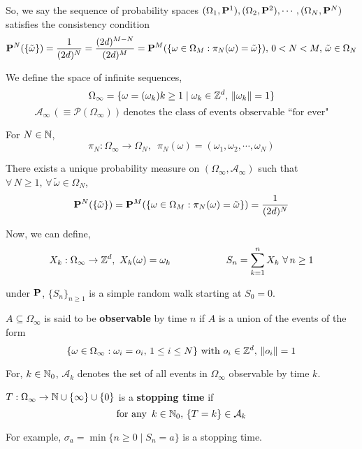 \documentclass[main]{subfiles}
\begin{document}
So, we say the sequence of probability spaces $(\Omega_1,\P^1),(\Omega_2,\P^2),\cdots,(\Omega_N,\P^N)$ satisfies the consistency condition
$$\P^N(\{\tilde{\omega}\}) = \frac{1}{(2d)^N} = \frac{(2d)^{M-N}}{(2d)^M}=\P^M(\{\omega \in \Omega_M : \pi_N(\omega) = \tilde{\omega}\}),\,0<N<M,\,\tilde{\omega} \in \Omega_N $$

We define the space of infinite sequences,
$$\Omega_{\infty} = \{\omega = (\omega_k)k \geq 1 \mid \omega_k \in \Z^d,\,\lVert \omega_k \rVert = 1\}$$
$$\mathcal{A}_{\infty}\,(\equiv \mathcal{P}(\Omega_{\infty}))\,\text{denotes the class of events observable ``for ever"}$$

For $N \in \N$,
$$\pi_N : \Omega_{\infty} \to \Omega_N,\,\,\,\pi_N(\omega) = (\omega_1,\omega_2,\cdots,\omega_N)$$

\begin{theorem}
    \normalfont
    There exists a unique probability measure on $(\Omega_{\infty},\mathcal{A}_{\infty})$ such that $\forall\,N \geq 1,\,\forall\,\tilde{\omega} \in \Omega_N$,
    $$\P^N(\{\tilde{\omega}\}) =\P^M(\{\omega \in \Omega_M : \pi_N(\omega) = \tilde{\omega}\})= \frac{1}{(2d)^N}$$
\end{theorem}
Now, we can define,
$$X_k : \Omega_{\infty} \to \Z^d,\,\,X_k(\omega) = \omega_k \hspace{2cm} S_n = \sum_{k=1}^{n} X_k\,\,\forall\,n \geq 1$$

under $\P$, $\{S_n\}_{n \geq 1}$ is a simple random walk starting at $S_0 = 0$.

\begin{definition}
    \normalfont
    $A \subseteq \Omega_{\infty}$ is said to be \textbf{observable} by time $ n $ if $A$ is a union of the events of the form
    $$\{\omega \in \Omega_{\infty} : \omega_i = o_i,\,1 \leq i \leq N\}\,\,\text{with}\,\,o_i \in \Z^d,\,\lVert o_i \rVert = 1$$
\end{definition}

For, $k \in \N_{0}$, $\mathcal{A}_k$ denotes the set of all events in $\Omega_{\infty}$ observable by time $k$.

\begin{definition}
    \normalfont
    $T : \Omega_{\infty} \to \N \cup \{\infty\} \cup \{0\}$ is a \textbf{stopping time} if
    $$\text{for any}\,\,\,k \in \N_{0},\,\{T=k\} \in \mathcal{A}_k$$
\end{definition}

For example, $\sigma_a = \min\{n \geq 0 \mid S_n = a\}$ is a stopping time.
\end{document}
